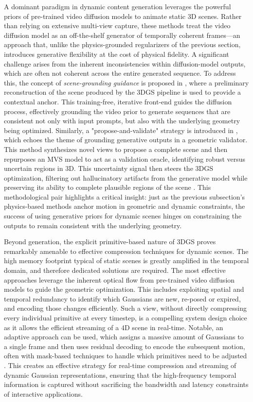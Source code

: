 \documentclass[11pt,a4paper]{article}
\begin{document}
A dominant paradigm in dynamic content generation leverages the powerful priors of pre-trained video diffusion models to animate static 3D scenes. Rather than relying on extensive multi-view capture, these methods treat the video diffusion model as an off-the-shelf generator of temporally coherent frames---an approach that, unlike the physics-grounded regularizers of the previous section, introduces generative flexibility at the cost of physical fidelity. A significant challenge arises from the inherent inconsistencies within diffusion-model outputs, which are often not coherent across the entire generated sequence. To address this, the concept of \emph{scene-grounding guidance} is proposed in \cite{arxiv:2503.05082v1}, where a preliminary reconstruction of the scene produced by the 3DGS pipeline is used to provide a contextual anchor. This training-free, iterative front-end guides the diffusion process, effectively grounding the video prior to generate sequences that are consistent not only with input prompts, but also with the underlying geometry being optimized. Similarly, a "propose-and-validate" strategy is introduced in \cite{arxiv:2509.23258v2}, which echoes the theme of grounding generative outputs in a geometric validator. This method synthesizes novel views to propose a complete scene and then repurposes an MVS model to act as a validation oracle, identifying robust versus uncertain regions in 3D. This uncertainty signal then steers the 3DGS optimization, filtering out hallucinatory artifacts from the generative model while preserving its ability to complete plausible regions of the scene \cite{arxiv:2509.23258v2}. This methodological pair highlights a critical insight: just as the previous subsection's physics-based methods anchor motion in geometric and dynamic constraints, the success of using generative priors for dynamic scenes hinges on constraining the outputs to remain consistent with the underlying geometry.

Beyond generation, the explicit primitive-based nature of 3DGS proves remarkably amenable to effective compression techniques for dynamic scenes. The high memory footprint typical of static scenes is greatly amplified in the temporal domain, and therefore dedicated solutions are required. The most effective approaches leverage the inherent optical flow from pre-trained video diffusion models to guide the geometric optimization. This includes exploiting spatial and temporal redundancy to identify which Gaussians are new, re-posed or expired, and encoding those changes efficiently. Such a view, without directly compressing every individual primitive at every timestep, is a compelling system design choice as it allows the efficient streaming of a 4D scene in real-time. Notable, an adaptive approach can be used, which assigns a massive amount of Gaussians to a single frame and then uses residual decoding to encode the subsequent motion, often with mask-based techniques to handle which primitives need to be adjusted \cite{arxiv:2605.14880v1}. This creates an effective strategy for real-time compression and streaming of dynamic Gaussian representations, ensuring that the high-frequency temporal information is captured without sacrificing the bandwidth and latency constraints of interactive applications.
\end{document}
